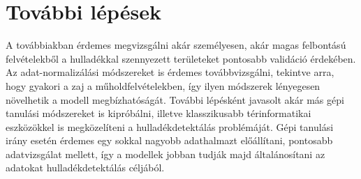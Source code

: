 \section{További lépések}

A továbbiakban érdemes megvizsgálni akár személyesen, akár magas felbontású felvételekből a hulladékkal szennyezett területeket pontosabb validáció érdekében. Az adat-normalizálási módszereket is érdemes továbbvizsgálni, tekintve arra, hogy gyakori a zaj a műholdfelvételekben, így ilyen módszerek lényegesen növelhetik a modell megbízhatóságát. További lépésként javasolt akár más gépi tanulási módszereket is kipróbálni, illetve klasszikusabb térinformatikai eszközökkel is megközelíteni a hulladékdetektálás problémáját. Gépi tanulási irány esetén érdemes egy sokkal nagyobb adathalmazt előállítani, pontosabb adatvizsgálat mellett, így a modellek jobban tudják majd általánosítani az adatokat hulladékdetektálás céljából.
